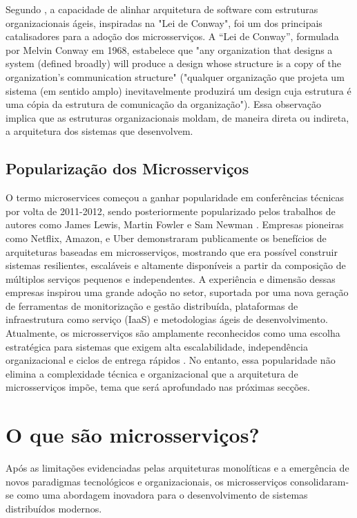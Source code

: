 Segundo \cite{Lewis2014}, a capacidade de alinhar arquitetura de software com estruturas organizacionais ágeis, inspiradas na "Lei de Conway", foi um dos principais catalisadores para a adoção dos microsserviços. A “Lei de Conway”, formulada por Melvin Conway em 1968, estabelece que "any organization that designs a system (defined broadly) will produce a design whose structure is a copy of the organization's communication structure" \cite{Bailey2013} ("qualquer organização que projeta um sistema (em sentido amplo) inevitavelmente produzirá um design cuja estrutura é uma cópia da estrutura de comunicação da organização"). Essa observação implica que as estruturas organizacionais moldam, de maneira direta ou indireta, a arquitetura dos sistemas que desenvolvem.



\subsection{Popularização dos Microsserviços}

O termo microservices começou a ganhar popularidade em conferências técnicas por volta de 2011-2012, sendo posteriormente popularizado pelos trabalhos de autores como James Lewis, Martin Fowler e Sam Newman \cite{Lewis2014,Newman2015}. Empresas pioneiras como Netflix, Amazon, e Uber demonstraram publicamente os benefícios de arquiteturas baseadas em microsserviços, mostrando que era possível construir sistemas resilientes, escaláveis e altamente disponíveis a partir da composição de múltiplos serviços pequenos e independentes.
A experiência e dimensão dessas empresas inspirou uma grande adoção no setor, suportada por uma nova geração de ferramentas de monitorização e gestão distribuída, plataformas de infraestrutura como serviço (IaaS) e metodologias ágeis de desenvolvimento.
Atualmente, os microsserviços são amplamente reconhecidos como uma escolha estratégica para sistemas que exigem alta escalabilidade, independência organizacional e ciclos de entrega rápidos 
\cite{Dragoni2017}. No entanto, essa popularidade não elimina a complexidade técnica e organizacional que a arquitetura de microsserviços impõe, tema que será aprofundado nas próximas secções.


\section{O que são microsserviços?}

Após as limitações evidenciadas pelas arquiteturas monolíticas e a emergência de novos paradigmas tecnológicos e organizacionais, os microsserviços consolidaram-se como uma abordagem inovadora para o desenvolvimento de sistemas distribuídos modernos.

